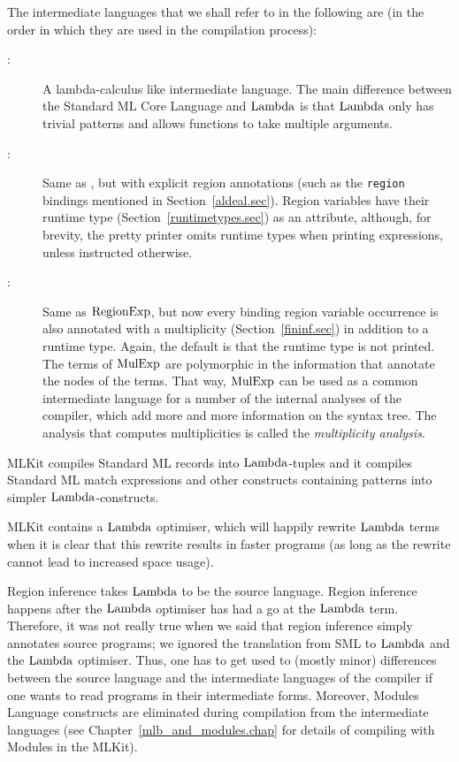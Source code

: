 \documentclass[12pt]{book}
\begin{document}
The intermediate languages that we shall refer to in the following are
(in the order in which they are used in the compilation process):
\begin{description}
\item[\Lam:]
  A lambda-calculus like intermediate language. The main difference between the
  Standard ML Core Language and $\hbox{\rm Lambda}$ is that $\hbox{\rm Lambda}$ only has trivial patterns
  and allows functions to take
  multiple arguments.
\item[\RegExp:]
  Same as \Lam, but with explicit region annotations (such as the \lstinline{region}
  bindings mentioned in Section~\ref{aldeal.sec}). Region variables have their
  runtime type (Section~\ref{runtimetypes.sec}) as an attribute, although, for
  brevity, the pretty printer omits runtime types when printing expressions,
  unless instructed otherwise.
\item[\MulExp:]
  Same as $\hbox{\rm RegionExp}$, but now every binding region variable occurrence is also
  annotated with a multiplicity (Section~\ref{fininf.sec}) in addition to a
  runtime type.  Again, the default is that the runtime type is not printed.
  The terms of $\hbox{\rm MulExp}$ are polymorphic in the information that annotate the
  nodes of the terms. That way, $\hbox{\rm MulExp}$ can be used as a common intermediate
  language for a number of the internal analyses of the compiler, which add more
  and more information on the syntax tree.  The analysis that computes
  multiplicities is called the
  {\em multiplicity analysis}.
\end{description}
MLKit compiles Standard ML records into $\hbox{\rm Lambda}$-tuples and it compiles
Standard ML match expressions and other constructs containing patterns into
simpler $\hbox{\rm Lambda}$-constructs.

MLKit contains a
%
%
$\hbox{\rm Lambda}$ optimiser, which will happily rewrite $\hbox{\rm Lambda}$ terms when it is clear that
this rewrite results in faster programs (as long as the rewrite cannot lead to
increased space usage).

Region inference takes $\hbox{\rm Lambda}$ to be the source language. Region inference
happens after the $\hbox{\rm Lambda}$ optimiser has had a go at the $\hbox{\rm Lambda}$ term.  Therefore,
it was not really true when we said that region inference simply annotates
source programs; we ignored the translation from SML to $\hbox{\rm Lambda}$ and the $\hbox{\rm Lambda}$
optimiser. Thus, one has to get used to (mostly minor) differences between the
source language and the intermediate languages of the compiler if one wants to
read programs in their intermediate forms. Moreover,
%
%
Modules Language constructs are eliminated during compilation from the
intermediate languages (see Chapter~\ref{mlb_and_modules.chap} for details of
compiling with Modules in the MLKit).
\end{document}

